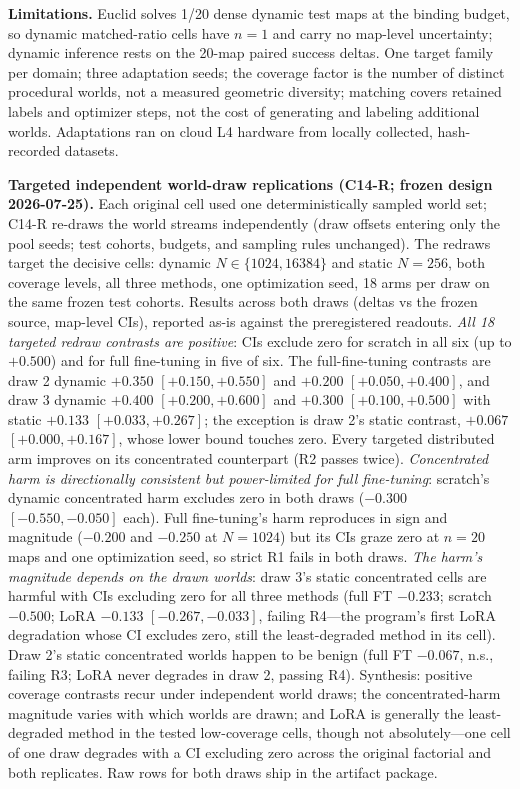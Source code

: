 \documentclass[letterpaper]{article} %
\begin{document}
\textbf{Limitations.} Euclid solves 1/20 dense dynamic test maps at the binding budget, so dynamic matched-ratio cells have $n{=}1$ and carry no map-level uncertainty; dynamic inference rests on the 20-map paired success deltas. One target family per domain; three adaptation seeds; the coverage factor is the number of distinct procedural worlds, not a measured geometric diversity; matching covers retained labels and optimizer steps, not the cost of generating and labeling additional worlds. Adaptations ran on cloud L4 hardware from locally collected, hash-recorded datasets.

\textbf{Targeted independent world-draw replications (C14-R; frozen design 2026-07-25).} Each original cell used one deterministically sampled world set; C14-R re-draws the world streams independently (draw offsets entering only the pool seeds; test cohorts, budgets, and sampling rules unchanged). The redraws target the decisive cells: dynamic $N \in \{1024, 16384\}$ and static $N{=}256$, both coverage levels, all three methods, one optimization seed, 18 arms per draw on the same frozen test cohorts. Results across both draws (deltas vs the frozen source, map-level CIs), reported as-is against the preregistered readouts. \emph{All 18 targeted redraw contrasts are positive}: CIs exclude zero for scratch in all six (up to $+0.500$) and for full fine-tuning in five of six. The full-fine-tuning contrasts are draw 2 dynamic $+0.350$ $[+0.150,+0.550]$ and $+0.200$ $[+0.050,+0.400]$, and draw 3 dynamic $+0.400$ $[+0.200,+0.600]$ and $+0.300$ $[+0.100,+0.500]$ with static $+0.133$ $[+0.033,+0.267]$; the exception is draw 2's static contrast, $+0.067$ $[+0.000,+0.167]$, whose lower bound touches zero. Every targeted distributed arm improves on its concentrated counterpart (R2 passes twice). \emph{Concentrated harm is directionally consistent but power-limited for full fine-tuning}: scratch's dynamic concentrated harm excludes zero in both draws ($-0.300$ $[-0.550,-0.050]$ each). Full fine-tuning's harm reproduces in sign and magnitude ($-0.200$ and $-0.250$ at $N{=}1024$) but its CIs graze zero at $n{=}20$ maps and one optimization seed, so strict R1 fails in both draws. \emph{The harm's magnitude depends on the drawn worlds}: draw 3's static concentrated cells are harmful with CIs excluding zero for all three methods (full FT $-0.233$; scratch $-0.500$; LoRA $-0.133$ $[-0.267,-0.033]$, failing R4---the program's first LoRA degradation whose CI excludes zero, still the least-degraded method in its cell). Draw 2's static concentrated worlds happen to be benign (full FT $-0.067$, n.s., failing R3; LoRA never degrades in draw 2, passing R4). Synthesis: positive coverage contrasts recur under independent world draws; the concentrated-harm magnitude varies with which worlds are drawn; and LoRA is generally the least-degraded method in the tested low-coverage cells, though not absolutely---one cell of one draw degrades with a CI excluding zero across the original factorial and both replicates. Raw rows for both draws ship in the artifact package.
\end{document}
